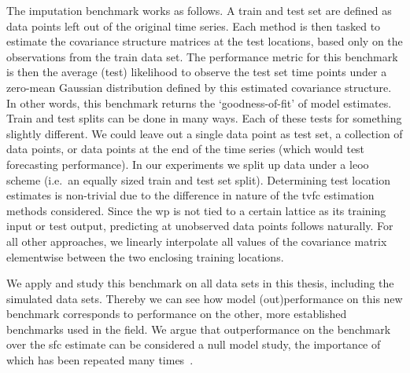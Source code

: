 The imputation benchmark works as follows.
A train and test set are defined as data points left out of the original time series.
%
Each method is then tasked to estimate the covariance structure matrices at the test locations, based only on the observations from the train data set.
The performance metric for this benchmark is then the average (test) likelihood to observe the test set time points under a zero-mean Gaussian distribution defined by this estimated covariance structure.
In other words, this benchmark returns the `goodness-of-fit' of model estimates.
%
Train and test splits can be done in many ways.
Each of these tests for something slightly different.
We could leave out a single data point as test set, a collection of data points, or data points at the end of the time series (which would test forecasting performance).
%
In our experiments we split up data under a \gls{leoo} scheme (i.e.~an equally sized train and test set split).
%
Determining test location estimates is non-trivial due to the difference in nature of the \gls{tvfc} estimation methods considered.
Since the \gls{wp} is not tied to a certain lattice as its training input or test output, predicting at unobserved data points follows naturally.
For all other approaches, we linearly interpolate all values of the covariance matrix elementwise between the two enclosing training locations.

We apply and study this benchmark on all data sets in this thesis, including the simulated data sets.
Thereby we can see how model (out)performance on this new benchmark corresponds to performance on the other, more established benchmarks used in the field.
%
We argue that outperformance on the benchmark over the \gls{sfc} estimate can be considered a null model study, the importance of which has been repeated many times~\parencite[see e.g.][]{Miller2018, Liegeois2021, Novelli2022}.
